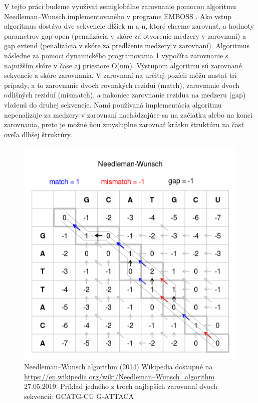 \indent  V tejto práci budeme využívať semiglobálne zarovnanie pomocou algoritmu Needleman–Wunsch \cite{Needleman70}  implementovaného v programe EMBOSS \cite{Emboss}. Ako vstup algoritmus dostáva dve sekvencie dĺžiek m a n, ktoré chceme zarovnať, a hodnoty parametrov gap open (penalizácia v skóre za otvorenie medzery v zarovnaní) a gap extend (penalizácia v skóre za predĺženie medzery v zarovnaní). Algoritmus následne za pomoci dynamického programovania \ref{obr03:aln} vypočíta zarovnanie s najnižším skóre v čase aj priestore O(nm).  Výstupom algoritmu sú zarovnané sekvencie a skóre zarovnania. V zarovnaní na určitej pozícii môžu nastať tri prípady, a to zarovnanie dvoch rovnakých reziduí (match), zarovnanie dvoch odlišných reziduí (mismatch), a nakoniec zarovnanie rezidua na medzeru (gap) vloženú do druhej sekvencie. Nami používaná implementácia algoritmu nepenalizuje za medzery v zarovnaní nachádzajúce sa na začiatku alebo na konci zarovnania, preto je možné ňou zmysluplne zarovnať krátku štruktúru na časť oveľa dlhšej štruktúry.

\begin{figure}%
\includegraphics[width=\textwidth]{../img/needlemanwunsch}
\caption{Needleman–Wunsch algorithm (2014) Wikipedia dostupné na \url{https://en.wikipedia.org/wiki/Needleman–Wunsch\_algorithm} 27.05.2019. Príklad jedného z troch najlepších zarovnaní dvoch sekvencií: \newline GCATG-CU \newline G-ATTACA}
\label{obr03:aln}
\end{figure}


